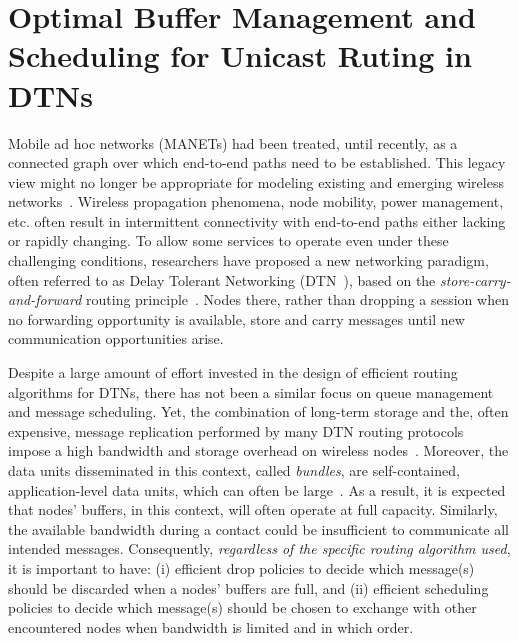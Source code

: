 ﻿\chapter{Optimal Buffer Management and Scheduling for Unicast Ruting in DTNs}
\label{chapter:ptp}
\minitoc

Mobile ad hoc networks (MANETs) had been treated, until recently, as a connected graph over which
end-to-end paths need to be established. This legacy view might no longer be appropriate for modeling existing and emerging wireless networks~\cite{Fall:DTNrouting,Fall:Sigcomm05,Glance:pollen}. Wireless propagation phenomena, node mobility, power management, etc. often result in intermittent connectivity with end-to-end paths either lacking or rapidly changing. To allow some services to operate even under these challenging conditions, researchers have proposed a new networking paradigm, often referred to as Delay Tolerant Networking (DTN~\cite{dtnrg}), based on the \emph{store-carry-and-forward} routing principle~\cite{Fall:DTNrouting}. Nodes there, rather than dropping a session when no forwarding opportunity is available, store and carry messages until new communication opportunities arise.

Despite a large amount of effort invested in the design of efficient routing algorithms for DTNs, there has not been a similar focus on queue management and message scheduling. Yet, the combination of long-term storage and the, often expensive, message replication performed by many DTN routing protocols~\cite{Vahdat:epidemic,Lindgren:probabilistic} impose a high bandwidth and storage overhead on wireless nodes~\cite{akis:ton-multi}. Moreover, the data units disseminated in this context, called \emph{bundles}, are self-contained, application-level data units, which can often be large~\cite{dtnrg}. As a result, it is expected that nodes' buffers, in this context, will often operate at full capacity. Similarly, the available bandwidth during a contact could be insufficient to communicate all intended messages. Consequently, \emph{regardless of the specific routing algorithm used}, it is important to have: (i) efficient drop policies to decide which message(s) should be discarded when a nodes' buffers are full, and (ii) efficient scheduling policies to decide which message(s) should be chosen to exchange with other encountered nodes when bandwidth is limited and in which order.

